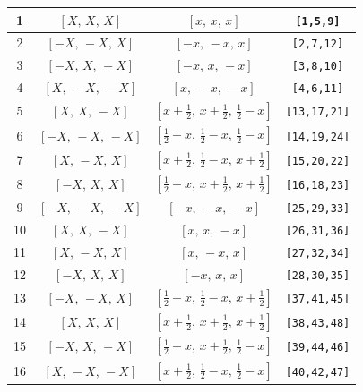 \documentclass[fleqn,8pt]{jsarticle}
\begin{document}
\begin{longtable}{cccc}
1 & $\left[ X,\, X,\, X \right]$ & $\left[ x,\, x,\, x \right]$ & {\tt [1,5,9]} \\ \hline
2 & $\left[ - X,\, - X,\, X \right]$ & $\left[ - x,\, - x,\, x \right]$ & {\tt [2,7,12]} \\ \hline
3 & $\left[ - X,\, X,\, - X \right]$ & $\left[ - x,\, x,\, - x \right]$ & {\tt [3,8,10]} \\ \hline
4 & $\left[ X,\, - X,\, - X \right]$ & $\left[ x,\, - x,\, - x \right]$ & {\tt [4,6,11]} \\ \hline
5 & $\left[ X,\, X,\, - X \right]$ & $\left[ x + \frac{1}{2},\, x + \frac{1}{2},\, \frac{1}{2} - x \right]$ & {\tt [13,17,21]} \\ \hline
6 & $\left[ - X,\, - X,\, - X \right]$ & $\left[ \frac{1}{2} - x,\, \frac{1}{2} - x,\, \frac{1}{2} - x \right]$ & {\tt [14,19,24]} \\ \hline
7 & $\left[ X,\, - X,\, X \right]$ & $\left[ x + \frac{1}{2},\, \frac{1}{2} - x,\, x + \frac{1}{2} \right]$ & {\tt [15,20,22]} \\ \hline
8 & $\left[ - X,\, X,\, X \right]$ & $\left[ \frac{1}{2} - x,\, x + \frac{1}{2},\, x + \frac{1}{2} \right]$ & {\tt [16,18,23]} \\ \hline
9 & $\left[ - X,\, - X,\, - X \right]$ & $\left[ - x,\, - x,\, - x \right]$ & {\tt [25,29,33]} \\ \hline
10 & $\left[ X,\, X,\, - X \right]$ & $\left[ x,\, x,\, - x \right]$ & {\tt [26,31,36]} \\ \hline
11 & $\left[ X,\, - X,\, X \right]$ & $\left[ x,\, - x,\, x \right]$ & {\tt [27,32,34]} \\ \hline
12 & $\left[ - X,\, X,\, X \right]$ & $\left[ - x,\, x,\, x \right]$ & {\tt [28,30,35]} \\ \hline
13 & $\left[ - X,\, - X,\, X \right]$ & $\left[ \frac{1}{2} - x,\, \frac{1}{2} - x,\, x + \frac{1}{2} \right]$ & {\tt [37,41,45]} \\ \hline
14 & $\left[ X,\, X,\, X \right]$ & $\left[ x + \frac{1}{2},\, x + \frac{1}{2},\, x + \frac{1}{2} \right]$ & {\tt [38,43,48]} \\ \hline
15 & $\left[ - X,\, X,\, - X \right]$ & $\left[ \frac{1}{2} - x,\, x + \frac{1}{2},\, \frac{1}{2} - x \right]$ & {\tt [39,44,46]} \\ \hline
16 & $\left[ X,\, - X,\, - X \right]$ & $\left[ x + \frac{1}{2},\, \frac{1}{2} - x,\, \frac{1}{2} - x \right]$ & {\tt [40,42,47]} \\
\end{longtable}
\renewcommand{\arraystretch}{1.2}
\end{document}

